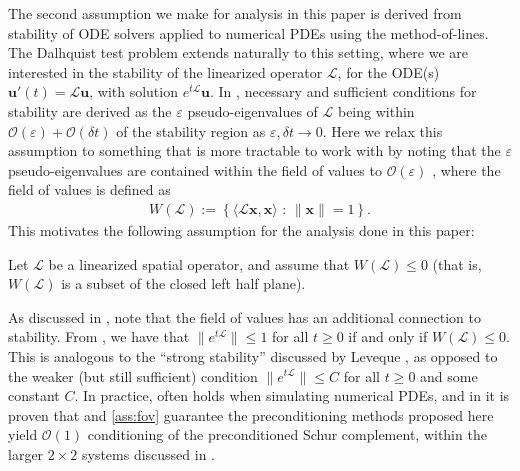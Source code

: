 \documentclass[review]{siamart}
\begin{document}
The second assumption we make for analysis in this paper is derived from
stability of ODE solvers applied to numerical PDEs using the method-of-lines.
The Dalhquist test problem extends naturally to this setting, where we are
interested in the stability of the linearized operator $\mathcal{L}$, for
the ODE(s) $\mathbf{u}'(t) = \mathcal{L}\mathbf{u}$, with solution
$e^{t\mathcal{L}}\mathbf{u}$. In \cite{reddy92}, necessary and sufficient
conditions for stability are derived as the $\varepsilon$ pseudo-eigenvalues
of $\mathcal{L}$ being within $\mathcal{O}(\varepsilon) + \mathcal{O}(\delta t)$
of the stability region as $\varepsilon,\delta t\to 0$. Here we relax this
assumption to something that is more tractable to work with by noting that
the $\varepsilon$ pseudo-eigenvalues are contained within the field of values
to $\mathcal{O}(\varepsilon)$ \cite[Eq. (17.9)]{trefethen2005spectra},
where the field of values is defined as
%
\begin{align}\label{eq:fov}
W(\mathcal{L}) := \left\{ \langle \mathcal{L}\mathbf{x},\mathbf{x}\rangle \text{ : }
	\|\mathbf{x}\| = 1 \right\}.
\end{align}
%
This motivates the following assumption for the analysis done in this paper:
%
\begin{assumption}\label{ass:fov}
Let $\mathcal{L}$ be a linearized spatial operator, and assume that $W(\mathcal{L}) \leq 0$
(that is, $W(\mathcal{L})$ is a subset of the closed left half plane).
\end{assumption}
%
As discussed in \cite{irk1}, note that the field of values has an additional
connection to stability. From \cite[Theorem 17.1]{trefethen2005spectra}, we
have that $\|e^{t\mathcal{L}}\|\leq 1$ for all $t\geq 0$ if and only if
$W(\mathcal{L}) \leq 0$. This is analogous to the ``strong stability'' discussed
by Leveque \cite[Chapter 9.5]{leveque2007finite}, as opposed to the weaker (but
still sufficient) condition $\|e^{t\mathcal{L}}\|\leq C$ for all $t\geq 0$ and
some constant $C$. In practice,  often holds when
simulating numerical PDEs, and in  it is proven that
 and \ref{ass:fov} guarantee the preconditioning methods
proposed here yield $\mathcal{O}(1)$ conditioning of the preconditioned Schur
complement, within the larger $2\times 2$ systems discussed in
.


\end{document}
